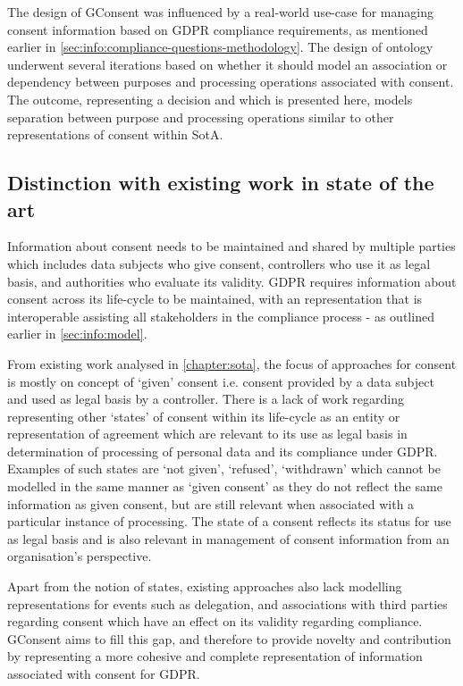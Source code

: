 The design of GConsent was influenced by a real-world use-case for managing consent information based on GDPR compliance requirements, as mentioned earlier in \autoref{sec:info:compliance-questions-methodology}.
The design of ontology underwent several iterations based on whether it should model an association or dependency between purposes and processing operations associated with consent. The outcome, representing a decision and which is presented here, models separation between purpose and processing operations similar to other representations of consent within SotA.

\subsection{Distinction with existing work in state of the art}
Information about consent needs to be maintained and shared by multiple parties which includes data subjects who give consent, controllers who use it as legal basis, and authorities who evaluate its validity. GDPR requires information about consent across its life-cycle to be maintained, with an representation that is interoperable assisting all stakeholders in the compliance process - as outlined earlier in \autoref{sec:info:model}.

From existing work analysed in \autoref{chapter:sota}, the focus of approaches for consent is mostly on concept of `given' consent i.e. consent provided by a data subject and used as legal basis by a controller. There is a lack of work regarding representing other `states' of consent within its life-cycle as an entity or representation of agreement which are relevant to its use as legal basis in determination of processing of personal data and its compliance under GDPR.
Examples of such states are `not given', `refused', `withdrawn' which cannot be modelled in the same manner as `given consent' as they do not reflect the same information as given consent, but are still relevant when associated with a particular instance of processing. The state of a consent reflects its status for use as legal basis and is also relevant in management of consent information from an organisation's perspective.

Apart from the notion of states, existing approaches also lack modelling representations for events such as delegation, and associations with third parties regarding consent which have an effect on its validity regarding compliance.
GConsent aims to fill this gap, and therefore to provide novelty and contribution by representing a more cohesive and complete representation of information associated with consent for GDPR.

